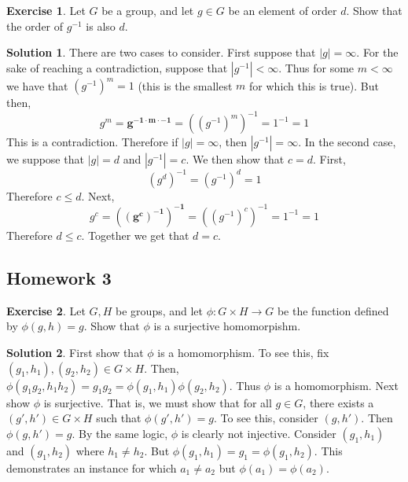 \documentclass[12pt]{article}
\theoremstyle{definition}
\newtheorem{exercise}{\color{YellowOrange}Exercise}
\theoremstyle{definition}
\newtheorem{solution}{\color{Goldenrod}Solution}
\begin{document}
\begin{exercise}
Let $G$ be a group, and let $g \in G$ be an element of order $d$. Show that the order of $g^{-1}$ is also $d$.
\end{exercise}
\begin{solution}
There are two cases to consider. First suppose that $|g| = \infty$. For the sake of reaching a contradiction, suppose that $|g^{-1}| < \infty$. Thus for some $m < \infty$ we have that $(g^{-1})^m = 1$ (this is the smallest $m$ for which this is true). But then,
\begin{equation}
	g^m = \mathbf{g^{-1 \cdot m \cdot -1}} = ((g^{-1})^m)^{-1} = 1^{-1} = 1
\end{equation}
This is a contradiction. Therefore if $|g| = \infty$, then $|g^{-1}| = \infty$. In the second case, we suppose that $|g| = d$ and $|g^{-1}| = c$. We then show that $c=d$. First,
\begin{equation}
	(g^d)^{-1} = (g^{-1})^d = 1
\end{equation}
Therefore $c \leq d$. Next, 
\begin{equation}
	g^c = \mathbf{((g^c)^{-1})^{-1}} = ((g^{-1})^c)^{-1} = 1^{-1} = 1
\end{equation}
Therefore $d \leq c$. Together we get that $d = c$.
\end{solution}

\subsection{Homework 3}
\begin{exercise}
Let $G, H$ be groups, and let $\phi: G \times H \to G$ be the function defined by $\phi(g,h) = g$. Show that $\phi$ is a surjective homomorpishm. 
\end{exercise}
\begin{solution}
First show that $\phi$ is a homomorphism. To see this, fix $(g_1, h_1), (g_2, h_2) \in G \times H$. Then,
$\phi(g_1g_2, h_1h_2) = g_1 g_2 = \phi(g_1,h_1) \phi(g_2,h_2)$. Thus $\phi$ is a homomorphism. Next show $\phi$ is surjective. That is, we must show that for all $g \in G$, there exists a $(g', h') \in G \times H$ such that $\phi(g',h') = g$. To see this, consider $(g,h')$. Then $\phi(g,h') = g$. By the same logic, $\phi$ is clearly not injective. Consider $(g_1, h_1)$ and $(g_1, h_2)$ where $h_1 \neq h_2$. But $\phi(g_1,h_1) = g_1 = \phi(g_1, h_2)$. This demonstrates an instance for which $a_1 \neq a_2$ but $\phi(a_1) = \phi(a_2)$. 
\end{solution}
\end{document}

